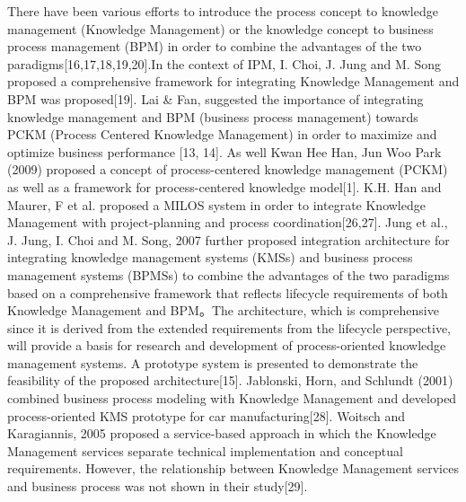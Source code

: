 \documentclass[doublespacing]{elsarticle}
\begin{document}
There have been various efforts to introduce the process concept to knowledge management (Knowledge Management) or the knowledge concept to business process management (BPM) in order to combine the advantages of the two paradigms[16,17,18,19,20].In the context of IPM, I. Choi, J. Jung and M. Song proposed a comprehensive framework for integrating Knowledge Management and BPM was proposed[19]. Lai \& Fan, suggested the importance of integrating knowledge management and BPM (business process management) towards PCKM (Process Centered Knowledge Management) in order to maximize and optimize business performance [13, 14]. As well Kwan Hee Han, Jun Woo Park (2009) proposed a concept of process-centered knowledge management (PCKM) as well as a framework for process-centered knowledge model[1]. K.H. Han and Maurer, F et al. proposed a MILOS system in order to integrate Knowledge Management with project-planning and process coordination[26,27]. Jung et al., J. Jung, I. Choi and M. Song, 2007 further proposed integration architecture for integrating knowledge management systems (KMSs) and business process management systems (BPMSs) to combine the advantages of the two paradigms based on a comprehensive framework that reflects lifecycle requirements of both Knowledge Management and BPM。The architecture, which is comprehensive since it is derived from the extended requirements from the lifecycle perspective, will provide a basis for research and development of process-oriented knowledge management systems. A prototype system is presented to demonstrate the feasibility of the proposed architecture[15]. 
Jablonski, Horn, and Schlundt (2001) combined business process modeling with Knowledge Management and developed process-oriented KMS prototype for car manufacturing[28]. Woitsch and Karagiannis, 2005 proposed a service-based approach in which the Knowledge Management services separate technical implementation and conceptual requirements. However, the relationship between Knowledge Management services and business process was not shown in their study[29]. 
\end{document}
